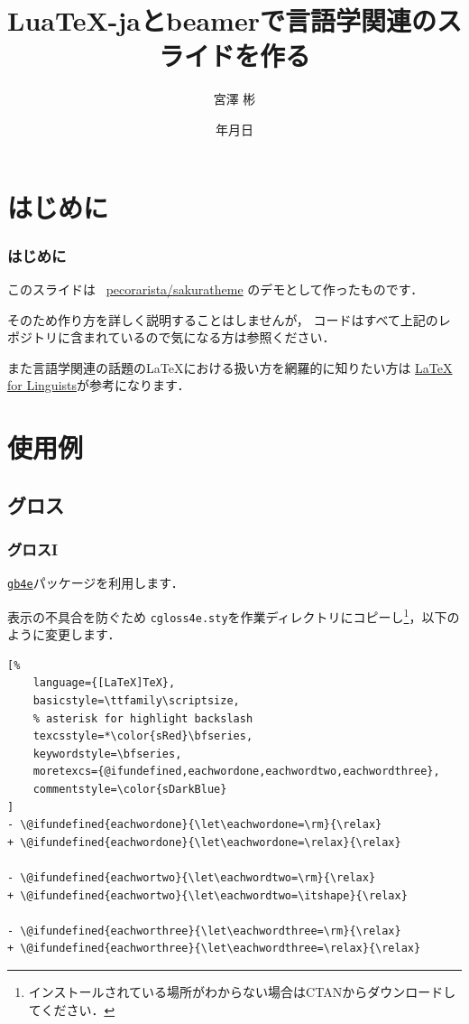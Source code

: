 \documentclass[12pt,unicode]{beamer}
\title{Lua\TeX{}-jaとbeamerで言語学関連のスライドを作る}
\institute{総合研究大学院大学}
\author{宮澤 彬}
\date{{\number\year}年{\number\month}月{\number\day}日}
\begin{document}
\begin{frame}
    \maketitle
\end{frame}

\section{はじめに}
\begin{frame}
    \frametitle{はじめに}
    このスライドは \faGithub\ \href{https://github.com/pecorarista/sakuratheme}{\ttfamily pecorarista/sakuratheme}
    のデモとして作ったものです．

    \bigskip

    そのため作り方を詳しく説明することはしませんが，
    コードはすべて上記のレポジトリに含まれているので気になる方は参照ください．
    \bigskip

    また言語学関連の話題の\LaTeX における扱い方を網羅的に知りたい方は
    \href{https://www1.essex.ac.uk/linguistics/external/clmt/latex4ling/}
    {LaTeX for Linguists}が参考になります．
\end{frame}

\section{使用例}
\subsection{グロス}
\begin{frame}[fragile]
\frametitle{グロスI}
\href{https://ctan.org/pkg/gb4e}{\texttt{gb4e}}パッケージを利用します．

\bigskip

表示の不具合を防ぐため
    \texttt{cgloss4e.sty}を作業ディレクトリにコピーし\footnote[frame]{%
インストールされている場所がわからない場合はCTANからダウンロードしてください．
}，以下のように変更します．
\begin{leftbar}
\begin{lstlisting}[%
    language={[LaTeX]TeX},
    basicstyle=\ttfamily\scriptsize,
    % asterisk for highlight backslash
    texcsstyle=*\color{sRed}\bfseries,
    keywordstyle=\bfseries,
    moretexcs={@ifundefined,eachwordone,eachwordtwo,eachwordthree},
    commentstyle=\color{sDarkBlue}
]
- \@ifundefined{eachwordone}{\let\eachwordone=\rm}{\relax}
+ \@ifundefined{eachwordone}{\let\eachwordone=\relax}{\relax}

- \@ifundefined{eachwortwo}{\let\eachwordtwo=\rm}{\relax}
+ \@ifundefined{eachwortwo}{\let\eachwordtwo=\itshape}{\relax}

- \@ifundefined{eachworthree}{\let\eachwordthree=\rm}{\relax}
+ \@ifundefined{eachworthree}{\let\eachwordthree=\relax}{\relax}
\end{lstlisting}
\end{leftbar}
\end{frame}
\end{document}
